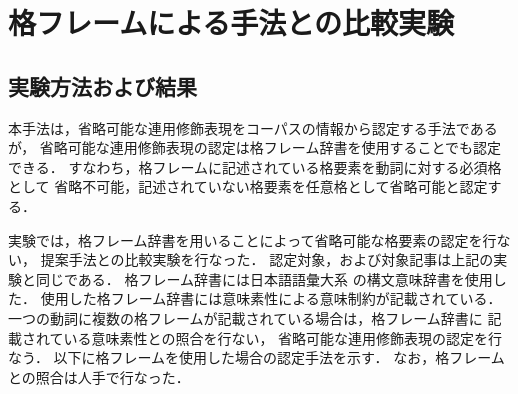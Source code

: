 \section{格フレームによる手法との比較実験}
\subsection{実験方法および結果}
本手法は，省略可能な連用修飾表現をコーパスの情報から認定する手法であるが，
省略可能な連用修飾表現の認定は格フレーム辞書を使用することでも認定できる．
すなわち，格フレームに記述されている格要素を動詞に対する必須格として
省略不可能，記述されていない格要素を任意格として省略可能と認定する．

実験では，格フレーム辞書を用いることによって省略可能な格要素の認定を行ない，
提案手法との比較実験を行なった．
認定対象，および対象記事は上記の実験と同じである．
格フレーム辞書には日本語語彙大系\cite{goi} の構文意味辞書を使用した．
使用した格フレーム辞書には意味素性による意味制約が記載されている．
一つの動詞に複数の格フレームが記載されている場合は，格フレーム辞書に
記載されている意味素性との照合を行ない，
省略可能な連用修飾表現の認定を行なう．
以下に格フレームを使用した場合の認定手法を示す．
なお，格フレームとの照合は人手で行なった．
